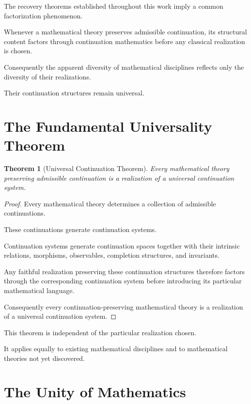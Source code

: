 \documentclass[13pt,openany]{book}
\theoremstyle{plain}
\newtheorem{theorem}{Theorem}[chapter]
\theoremstyle{definition}
\begin{document}
The recovery theorems established throughout this work imply a common
factorization phenomenon.

Whenever a mathematical theory preserves admissible continuation, its structural
content factors through continuation mathematics before any classical
realization is chosen.

Consequently the apparent diversity of mathematical disciplines reflects only
the diversity of their realizations.

Their continuation structures remain universal.

\section{The Fundamental Universality Theorem}

\begin{theorem}[Universal Continuation Theorem]
Every mathematical theory preserving admissible continuation is a realization
of a universal continuation system.
\end{theorem}

\begin{proof}
Every mathematical theory determines a collection of admissible continuations.

These continuations generate continuation systems.

Continuation systems generate continuation spaces together with their intrinsic
relations, morphisms, observables, completion structures, and invariants.

Any faithful realization preserving these continuation structures therefore
factors through the corresponding continuation system before introducing its
particular mathematical language.

Consequently every continuation-preserving mathematical theory is a realization
of a universal continuation system.
\end{proof}

This theorem is independent of the particular realization chosen.

It applies equally to existing mathematical disciplines and to mathematical
theories not yet discovered.

\section{The Unity of Mathematics}
\end{document}
